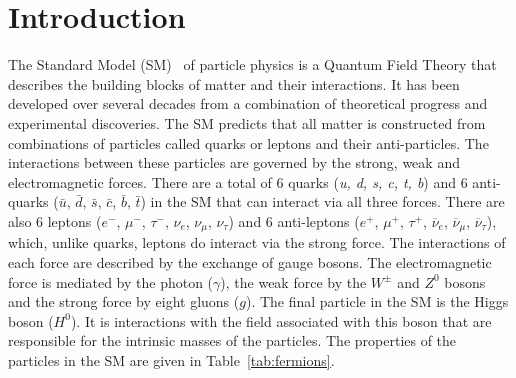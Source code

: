 \chapter{{\bf Introduction}}
\label{sec:intro}


The Standard Model (SM)~\cite{GLASHOW1961579,PhysRevLett.19.1264,PhysRevD.2.1285} of particle physics is a Quantum Field Theory that describes the building blocks of matter and their interactions. It has been developed over several decades from a combination of theoretical progress and experimental discoveries. 
The SM predicts that all matter is constructed from combinations of particles called quarks or leptons and their anti-particles. The interactions between these particles are governed by the strong, weak and electromagnetic forces. 
There are a total of 6 quarks ({\it u, d, s, c, t, b}) and 6 anti-quarks ($\bar{u}$, $\bar{d}$, $\bar{s}$, $\bar{c}$, $\bar{b}$, $\bar{t}$) in the SM that can interact via all three forces. There are also 6 leptons ($e^{-}$, $\mu^{-}$, $\tau^{-}$, $\nu_e$, $\nu_{\mu}$, $\nu_{\tau}$) and 6 anti-leptons ($e^{+}$, $\mu^{+}$, $\tau^{+}$, $\overline{\nu}_e$, $\overline{\nu}_{\mu}$, $\overline{\nu}_{\tau}$), which, unlike quarks, leptons do interact via the strong force.
The interactions of each force are described by the exchange of gauge bosons. The electromagnetic force is mediated by the photon ($\gamma$), the weak force by the $W^{\pm}$ and $Z^0$ bosons and the strong force by eight gluons ($g$). 
The final particle in the SM is the Higgs boson ($H^0$). It is interactions with the field associated with this boson that are responsible for the intrinsic masses of the particles. The properties of the particles in the SM are given in Table~\ref{tab:fermions}.


